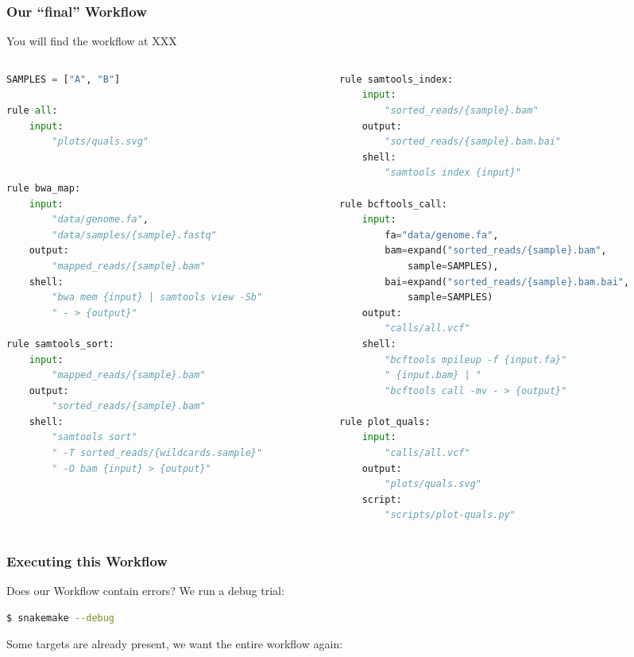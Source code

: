 \begin{frame}[fragile]
  \frametitle{Our ``final'' Workflow}
  You will find the workflow at XXX
  \begin{columns}
    \begin{column}{0.5\textwidth}
      \begin{lstlisting}[language=Python,style=Python,basicstyle=\tiny]
SAMPLES = ["A", "B"]

rule all:
    input:
        "plots/quals.svg"


rule bwa_map:
    input:
        "data/genome.fa",
        "data/samples/{sample}.fastq"
    output:
        "mapped_reads/{sample}.bam"
    shell:
        "bwa mem {input} | samtools view -Sb"
        " - > {output}"

rule samtools_sort:
    input:
        "mapped_reads/{sample}.bam"
    output:
        "sorted_reads/{sample}.bam"
    shell:
        "samtools sort"
        " -T sorted_reads/{wildcards.sample}"
        " -O bam {input} > {output}"
      \end{lstlisting}
    \end{column}
    \begin{column}{0.5\textwidth}
      \begin{lstlisting}[language=Python,style=Python,basicstyle=\tiny]
rule samtools_index:
    input:
        "sorted_reads/{sample}.bam"
    output:
        "sorted_reads/{sample}.bam.bai"
    shell:
        "samtools index {input}"

rule bcftools_call:
    input:
        fa="data/genome.fa",
        bam=expand("sorted_reads/{sample}.bam",
            sample=SAMPLES),
        bai=expand("sorted_reads/{sample}.bam.bai",
            sample=SAMPLES)
    output:
        "calls/all.vcf"
    shell:
        "bcftools mpileup -f {input.fa}"
        " {input.bam} | "
        "bcftools call -mv - > {output}"

rule plot_quals:
    input:
        "calls/all.vcf"
    output:
        "plots/quals.svg"
    script:
        "scripts/plot-quals.py"
      \end{lstlisting}
    \end{column}
  \end{columns}
\end{frame}

\begin{frame}[fragile]
  \frametitle{Executing this Workflow}
  Does our Workflow contain errors? We run a debug trial:
  \begin{lstlisting}[language=Bash, style=Shell]
$ snakemake --debug
  \end{lstlisting}
  \pause
  Some targets are already present, we want the entire workflow again:
  \begin{lstlisting}[language=Bash, style=Shell]
% $ snakemake -j4 --forcerun
  \end{lstlisting}
\end{frame}
